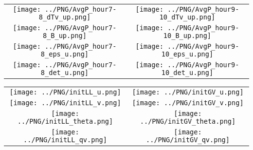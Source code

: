 \documentclass{article}
\begin{document}
\newpage

\begin{table}
  \begin{tabular}{cc}
     \texttt{[image: ../PNG/AvgP\_hour7-8\_dTv\_up.png]} & \texttt{[image: ../PNG/AvgP\_hour9-10\_dTv\_up.png]} \\
     \texttt{[image: ../PNG/AvgP\_hour7-8\_B\_up.png]}   & \texttt{[image: ../PNG/AvgP\_hour9-10\_B\_up.png]}   \\
     \texttt{[image: ../PNG/AvgP\_hour7-8\_eps\_u.png]}  & \texttt{[image: ../PNG/AvgP\_hour9-10\_eps\_u.png]}  \\
     \texttt{[image: ../PNG/AvgP\_hour7-8\_det\_u.png]}  & \texttt{[image: ../PNG/AvgP\_hour9-10\_det\_u.png]}
  \end{tabular}
\end{table}

\newpage

\begin{table}
  \begin{tabular}{cc}
     \texttt{[image: ../PNG/initLL\_u.png]}     & \texttt{[image: ../PNG/initGV\_u.png]}     \\
     \texttt{[image: ../PNG/initLL\_v.png]}     & \texttt{[image: ../PNG/initGV\_v.png]}     \\
     \texttt{[image: ../PNG/initLL\_theta.png]} & \texttt{[image: ../PNG/initGV\_theta.png]} \\
     \texttt{[image: ../PNG/initLL\_qv.png]}    & \texttt{[image: ../PNG/initGV\_qv.png]}
  \end{tabular}
\end{table}
\end{document}
